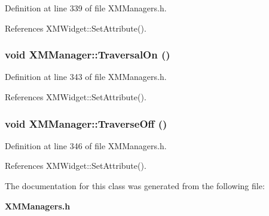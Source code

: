 Definition at line 339 of file XMManagers.h.

References XMWidget::Set\-Attribute().
\subsubsection{\setlength{\rightskip}{0pt plus 5cm}void XMManager::Traversal\-On ()\hspace{0.3cm}{\tt  [inline]}}\label{classXMManager_a7}




Definition at line 343 of file XMManagers.h.

References XMWidget::Set\-Attribute().
\subsubsection{\setlength{\rightskip}{0pt plus 5cm}void XMManager::Traverse\-Off ()\hspace{0.3cm}{\tt  [inline]}}\label{classXMManager_a8}




Definition at line 346 of file XMManagers.h.

References XMWidget::Set\-Attribute().

The documentation for this class was generated from the following file:\begin{CompactItemize}
\item 
{\bf XMManagers.h}\end{CompactItemize}
